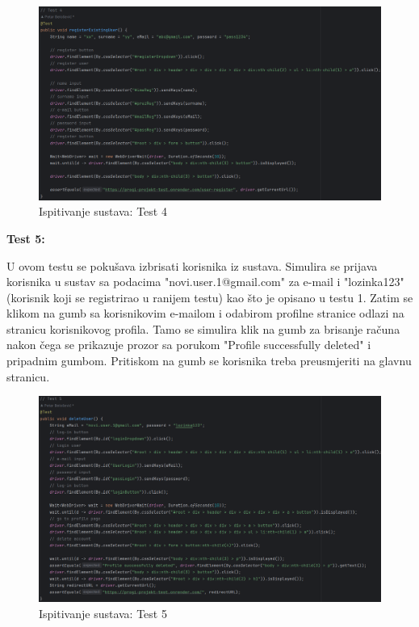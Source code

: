 		 	\begin{figure}[H]
		 		\includegraphics[width=\textwidth]{slike/SeleniumTest4.png} %
		 		\caption{Ispitivanje sustava: Test 4}
		 		\label{fig:SeleniumTest4} %
		 	\end{figure}
		 	
		 	\textbf{Test 5:}
		 	
		 	U ovom testu se pokušava izbrisati korisnika iz sustava. Simulira se prijava korisnika u sustav sa podacima "novi.user.1@gmail.com" za e-mail i "lozinka123" (korisnik koji se registrirao u ranijem testu) kao što je opisano u testu 1. Zatim se klikom na gumb sa korisnikovim e-mailom i odabirom profilne stranice odlazi na stranicu korisnikovog profila. Tamo se simulira klik na gumb za brisanje računa nakon čega se prikazuje prozor sa porukom "Profile successfully deleted" i pripadnim gumbom. Pritiskom na gumb se korisnika treba preusmjeriti na glavnu stranicu.
		 	
		 	\begin{figure}[H]
		 		\includegraphics[width=\textwidth]{slike/SeleniumTest5.png} %
		 		\caption{Ispitivanje sustava: Test 5}
		 		\label{fig:SeleniumTest5} %
		 	\end{figure}
		 	
